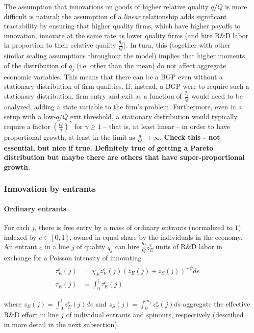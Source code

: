 \documentclass[12pt,english]{article}
\theoremstyle{remark}
\begin{document}
The assumption that innovations on goods of higher relative quality $q/Q$ is more difficult is natural; the assumption of a \textit{linear} relationship adds significant tractability by ensuring that higher quality firms, which have higher payoffs to innovation, innovate at the same rate as lower quality firms (and hire R\&D labor in proportion to their relative quality $\frac{q_j}{Q}$). In turn, this (together with other similar scaling assumptions throughout the model) implies that higher moments of the distribution of ${q_j}$ (i.e. other than the mean) do not affect aggregate economic variables. This means that there can be a BGP even without a stationary distribution of firm qualities. If, instead, a BGP were to require such a stationary distribution, firm entry and exit as a function of $\frac{q_j}{Q}$ would need to be analyzed, adding a state variable to the firm's problem. Furthermore, even in a setup with a low-$q/Q$ exit threshold, a stationary distribution would typically require a factor $(\frac{Q}{q})^{\gamma}$ for $\gamma \ge 1$ -- that is, at least linear -- in order to have proportional growth, at least in the limit as $\frac{q}{Q} \to \infty$. \textbf{Check this - not essential, but nice if true. Definitely true of getting a Pareto distribution but maybe there are others that have super-proportional growth.}

\subsubsection{Innovation by entrants}

\paragraph{Ordinary entrants}

For each $j$, there is free entry by a mass of ordinary entrants (normalized to $1$) indexed by $e \in [0,1]$, owned in equal share by the individuals in the economy. An entrant $e$ in a line $j$ of quality $q_j$ can hire $\frac{q_j}{Q} z_E^e$ units of R\&D labor in exchange for a Poisson intensity of innovating
\begin{align}
\tau_E^e(j) &= \chi_E z_E^e(j) (z_E(j) + z_S(j))^{-\hat{\psi}} de\label{simplified_entrant_innovation_rate} \\
\tau_E(j) &= \int_0^1 \tau_E^e(j) \nonumber
\end{align}

where $z_E(j) = \int_0^1 z_E^e(j) de$ and $z_S(j) = \int_0^{m_j} z_S^s(j) ds$ aggregate the effective R\&D effort in line $j$ of individual entrants and spinouts, respectively (described in more detail in the next subsection).
\end{document}
